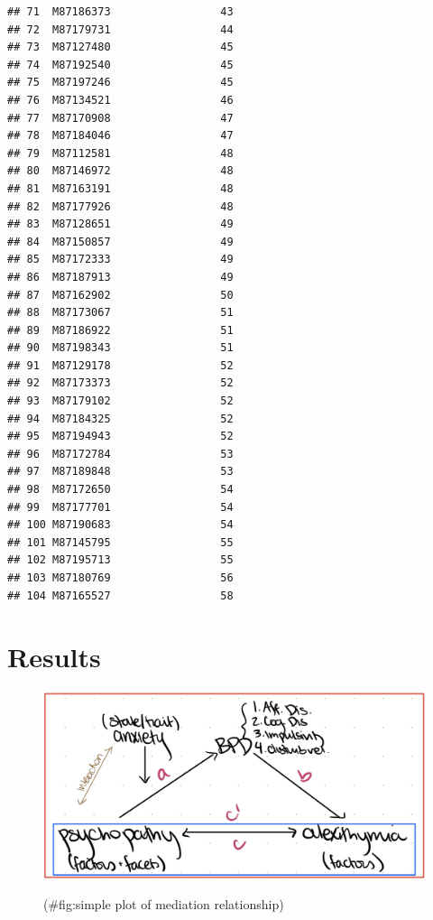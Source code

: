 \documentclass[
  man]{apa6}
\begin{document}
\begin{verbatim}
## 71  M87186373                 43
## 72  M87179731                 44
## 73  M87127480                 45
## 74  M87192540                 45
## 75  M87197246                 45
## 76  M87134521                 46
## 77  M87170908                 47
## 78  M87184046                 47
## 79  M87112581                 48
## 80  M87146972                 48
## 81  M87163191                 48
## 82  M87177926                 48
## 83  M87128651                 49
## 84  M87150857                 49
## 85  M87172333                 49
## 86  M87187913                 49
## 87  M87162902                 50
## 88  M87173067                 51
## 89  M87186922                 51
## 90  M87198343                 51
## 91  M87129178                 52
## 92  M87173373                 52
## 93  M87179102                 52
## 94  M87184325                 52
## 95  M87194943                 52
## 96  M87172784                 53
## 97  M87189848                 53
## 98  M87172650                 54
## 99  M87177701                 54
## 100 M87190683                 54
## 101 M87145795                 55
## 102 M87195713                 55
## 103 M87180769                 56
## 104 M87165527                 58
\end{verbatim}

\hypertarget{results}{%
\section{Results}\label{results}}

\begin{figure}
\includegraphics[width=1\linewidth]{images/IMG_0418} \caption{ }(\#fig:simple plot of mediation relationship)
\end{figure}
\end{document}
